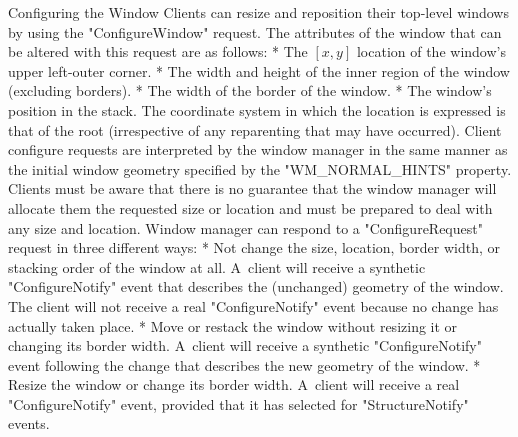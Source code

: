 \secc Configuring the Window
Clients can resize and reposition their top-level windows by using the "ConfigureWindow" request.
The attributes of the window that can be altered with this request are as follows:
\begitems
* The $[x,y]$ location of the window's upper left-outer corner.
* The width and height of the inner region of the window (excluding borders).
* The width of the border of the window.
* The window's position in the stack.
\enditems
The coordinate system in which the location is expressed is that of the root (irrespective of any reparenting that may have occurred).
Client configure requests are interpreted by the window manager in the same manner as the initial window geometry specified by the "WM_NORMAL_HINTS" property.
Clients must be aware that there is no guarantee that the window manager will allocate them the requested size or location
and must be prepared to deal with any size and location.
Window manager can respond to a "ConfigureRequest" request in three different ways:
\begitems
* Not change the size, location, border width, or stacking order of the window at all.\nl
A~client will receive a synthetic "ConfigureNotify" event that describes the (unchanged) geometry of the window.
The client will not receive a real "ConfigureNotify" event because no change has actually taken place.
* Move or restack the window without resizing it or changing its border width.\nl
A~client will receive a synthetic "ConfigureNotify" event following the change that describes the new geometry of the window.
* Resize the window or change its border width.\nl
A~client will receive a real "ConfigureNotify" event, provided that it has selected for "StructureNotify" events.
\enditems
